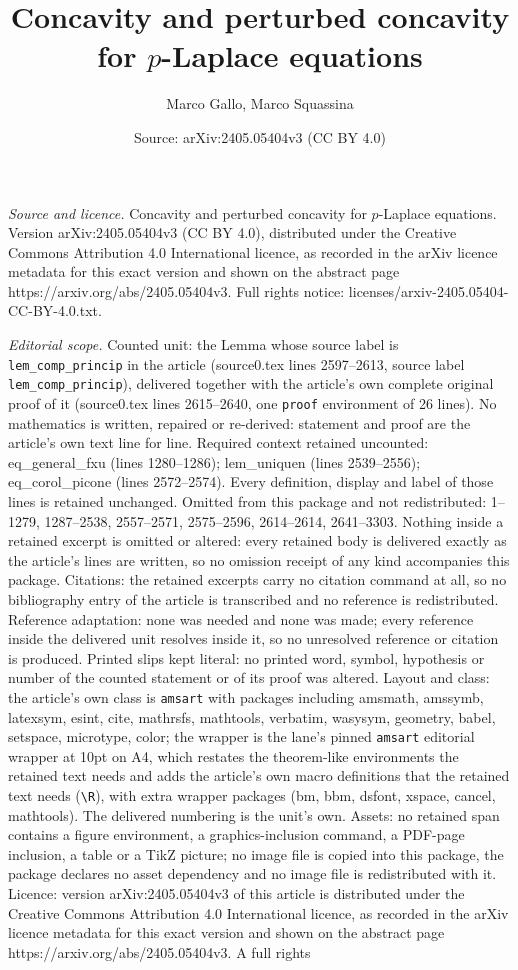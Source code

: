 \documentclass[10pt,a4paper]{amsart}
\title[Concavity and perturbed concavity for $p$-Laplace equations]{Concavity and perturbed concavity for $p$-Laplace equations}
\author{Marco Gallo, Marco Squassina}
\date{Source: arXiv:2405.05404v3 (CC BY 4.0)}
\begin{document}
\maketitle

\noindent\emph{Source and licence.} Concavity and perturbed concavity for $p$-Laplace equations. Version arXiv:2405.05404v3 (CC BY 4.0), distributed under the Creative Commons Attribution 4.0 International licence, as recorded in the arXiv licence metadata for this exact version and shown on the abstract page https://arxiv.org/abs/2405.05404v3. Full rights notice: licenses/arxiv-2405.05404-CC-BY-4.0.txt.\par\smallskip

\noindent\textit{Editorial scope.} Counted unit: the Lemma whose source label is \texttt{lem\_comp\_princip} in the article (source0.tex lines 2597--2613, source label \texttt{lem\_comp\_princip}), delivered together with the article's own complete original proof of it (source0.tex lines 2615--2640, one \texttt{proof} environment of 26 lines). No mathematics is written, repaired or re-derived: statement and proof are the article's own text line for line. Required context retained uncounted: eq\_general\_fxu (lines 1280--1286); lem\_uniquen (lines 2539--2556); eq\_corol\_picone (lines 2572--2574). Every definition, display and label of those lines is retained unchanged. Omitted from this package and not redistributed: 1--1279, 1287--2538, 2557--2571, 2575--2596, 2614--2614, 2641--3303. Nothing inside a retained excerpt is omitted or altered: every retained body is delivered exactly as the article's lines are written, so no omission receipt of any kind accompanies this package. Citations: the retained excerpts carry no citation command at all, so no bibliography entry of the article is transcribed and no reference is redistributed. Reference adaptation: none was needed and none was made; every reference inside the delivered unit resolves inside it, so no unresolved reference or citation is produced. Printed slips kept literal: no printed word, symbol, hypothesis or number of the counted statement or of its proof was altered. Layout and class: the article's own class is \texttt{amsart} with packages including amsmath, amssymb, latexsym, esint, cite, mathrsfs, mathtools, verbatim, wasysym, geometry, babel, setspace, microtype, color; the wrapper is the lane's pinned \texttt{amsart} editorial wrapper at 10pt on A4, which restates the theorem-like environments the retained text needs and adds the article's own macro definitions that the retained text needs (\texttt{\textbackslash R}), with extra wrapper packages (bm, bbm, dsfont, xspace, cancel, mathtools). The delivered numbering is the unit's own. Assets: no retained span contains a figure environment, a graphics-inclusion command, a PDF-page inclusion, a table or a TikZ picture; no image file is copied into this package, the package declares no asset dependency and no image file is redistributed with it. Licence: version arXiv:2405.05404v3 of this article is distributed under the Creative Commons Attribution 4.0 International licence, as recorded in the arXiv licence metadata for this exact version and shown on the abstract page https://arxiv.org/abs/2405.05404v3. A full rights 
\end{document}
